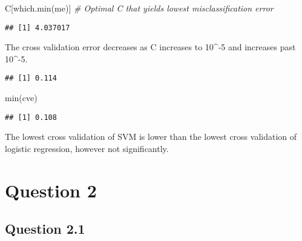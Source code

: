 \documentclass[
]{article}
\newenvironment{Shaded}{\begin{snugshade}}{\end{snugshade}}
\newcommand{\AttributeTok}[1]{\textcolor[rgb]{0.77,0.63,0.00}{#1}}
\newcommand{\CommentTok}[1]{\textcolor[rgb]{0.56,0.35,0.01}{\textit{#1}}}
\newcommand{\FunctionTok}[1]{\textcolor[rgb]{0.00,0.00,0.00}{#1}}
\newcommand{\NormalTok}[1]{#1}
\newcommand{\OtherTok}[1]{\textcolor[rgb]{0.56,0.35,0.01}{#1}}
\newcommand{\SpecialCharTok}[1]{\textcolor[rgb]{0.00,0.00,0.00}{#1}}
\newcommand{\StringTok}[1]{\textcolor[rgb]{0.31,0.60,0.02}{#1}}
\begin{document}
\begin{Shaded}
\begin{Highlighting}[]
\NormalTok{C[}\FunctionTok{which.min}\NormalTok{(me)] }\CommentTok{\# Optimal C that yields lowest misclassification error}
\end{Highlighting}
\end{Shaded}

\begin{verbatim}
## [1] 4.037017
\end{verbatim}

The cross validation error decreases as C increases to 10\^{}-5 and
increases past 10\^{}-5.

\begin{Shaded}
\end{Shaded}

\begin{verbatim}
## [1] 0.114
\end{verbatim}

\begin{Shaded}
\begin{Highlighting}[]
\FunctionTok{min}\NormalTok{(cve)}
\end{Highlighting}
\end{Shaded}

\begin{verbatim}
## [1] 0.108
\end{verbatim}

The lowest cross validation of SVM is lower than the lowest cross
validation of logistic regression, however not significantly.

\hypertarget{question-2}{%
\section{Question 2}\label{question-2}}

\hypertarget{question-2.1}{%
\subsection{Question 2.1}\label{question-2.1}}
\end{document}
